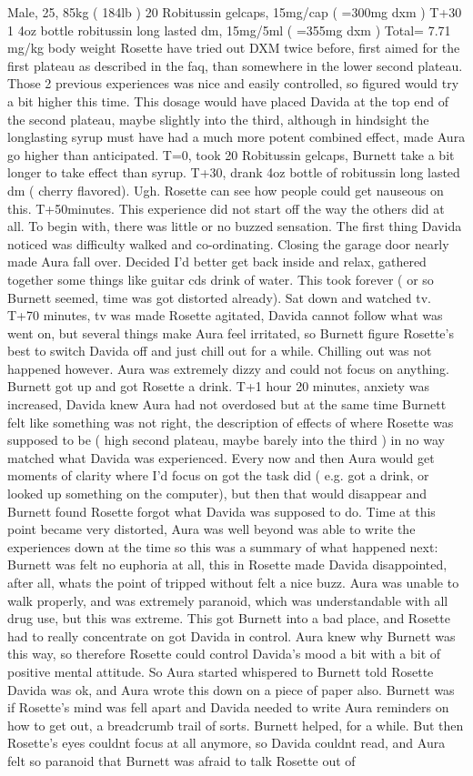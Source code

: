 \documentclass[12pt]{book}
\begin{document}
Male, 25, 85kg ( 184lb ) 20 Robitussin gelcaps, 15mg/cap ( =300mg dxm ) T+30 1 4oz bottle robitussin long lasted dm, 15mg/5ml ( =355mg dxm ) Total= 7.71 mg/kg body weight Rosette have tried out DXM twice before, first aimed for the first plateau as described in the faq, than somewhere in the lower second plateau. Those 2 previous experiences was nice and easily controlled, so figured would try a bit higher this time. This dosage would have placed Davida at the top end of the second plateau, maybe slightly into the third, although in hindsight the longlasting syrup must have had a much more potent combined effect, made Aura go higher than anticipated. T=0, took 20 Robitussin gelcaps, Burnett take a bit longer to take effect than syrup. T+30, drank 4oz bottle of robitussin long lasted dm ( cherry flavored). Ugh. Rosette can see how people could get nauseous on this. T+50minutes. This experience did not start off the way the others did at all. To begin with, there was little or no buzzed sensation. The first thing Davida noticed was difficulty walked and co-ordinating. Closing the garage door nearly made Aura fall over. Decided I'd better get back inside and relax, gathered together some things like guitar cds drink of water. This took forever ( or so Burnett seemed, time was got distorted already). Sat down and watched tv. T+70 minutes, tv was made Rosette agitated, Davida cannot follow what was went on, but several things make Aura feel irritated, so Burnett figure Rosette's best to switch Davida off and just chill out for a while. Chilling out was not happened however. Aura was extremely dizzy and could not focus on anything. Burnett got up and got Rosette a drink. T+1 hour 20 minutes, anxiety was increased, Davida knew Aura had not overdosed but at the same time Burnett felt like something was not right, the description of effects of where Rosette was supposed to be ( high second plateau, maybe barely into the third ) in no way matched what Davida was experienced. Every now and then Aura would get moments of clarity where I'd focus on got the task did ( e.g. got a drink, or looked up something on the computer), but then that would disappear and Burnett found Rosette forgot what Davida was supposed to do. Time at this point became very distorted, Aura was well beyond was able to write the experiences down at the time so this was a summary of what happened next: Burnett was felt no euphoria at all, this in Rosette made Davida disappointed, after all, whats the point of tripped without felt a nice buzz. Aura was unable to walk properly, and was extremely paranoid, which was understandable with all drug use, but this was extreme. This got Burnett into a bad place, and Rosette had to really concentrate on got Davida in control. Aura knew why Burnett was this way, so therefore Rosette could control Davida's mood a bit with a bit of positive mental attitude. So Aura started whispered to Burnett told Rosette Davida was ok, and Aura wrote this down on a piece of paper also. Burnett was if Rosette's mind was fell apart and Davida needed to write Aura reminders on how to get out, a breadcrumb trail of sorts. Burnett helped, for a while. But then Rosette's eyes couldnt focus at all anymore, so Davida couldnt read, and Aura felt so paranoid that Burnett was afraid to talk Rosette out of 
\end{document}
